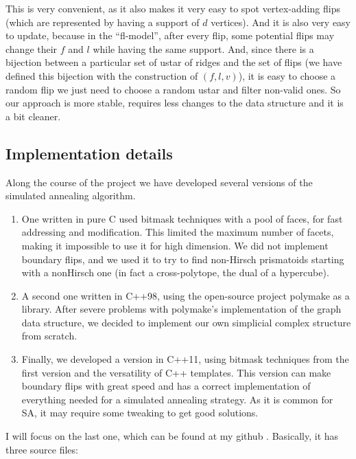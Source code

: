 \documentclass[12pt,a4paper]{article}
\theoremstyle{plain}
\theoremstyle{definition}
\begin{document}
This is very convenient, as it also makes it very easy to spot vertex-adding flips (which are represented by having a support of $d$ vertices). And it is also very easy to update, because in the ``fl-model'', after every flip, some potential flips may change their $f$ and $l$ while having the same support. And, since there is a bijection between a particular set of ustar of ridges and the set of flips (we have defined this bijection with the construction of $(f,l,v)$), it is easy to choose a random flip we just need to choose a random ustar and filter non-valid ones. So our approach is more stable, requires less changes to the data structure and it is a bit cleaner.
\subsection{Implementation details}

Along the course of the project we have developed several versions of the simulated annealing algorithm.

\begin{enumerate}
  \item One written in pure C used bitmask techniques with a pool of faces, for fast addressing and modification. This limited the maximum number of facets, making it impossible to use it for high dimension. We did not implement boundary flips, and we used it to try to find non-Hirsch prismatoids starting with a nonHirsch one (in fact a cross-polytope, the dual of a hypercube).
  
  \item A second one written in C++98, using the open-source project polymake \cite{polymake} as a library. After severe problems with polymake's implementation of the graph data structure, we decided to implement our own simplicial complex structure from scratch.

  \item Finally, we developed a version in C++11, using bitmask techniques from the first version and the versatility of C++ templates. This version can make boundary flips with great speed and has a correct implementation of everything needed for a simulated annealing strategy. As it is common for SA, it may require some tweaking to get good solutions.
\end{enumerate}

I will focus on the last one, which can be found at my github \cite{github}. Basically, it has three source files:
\end{document}
